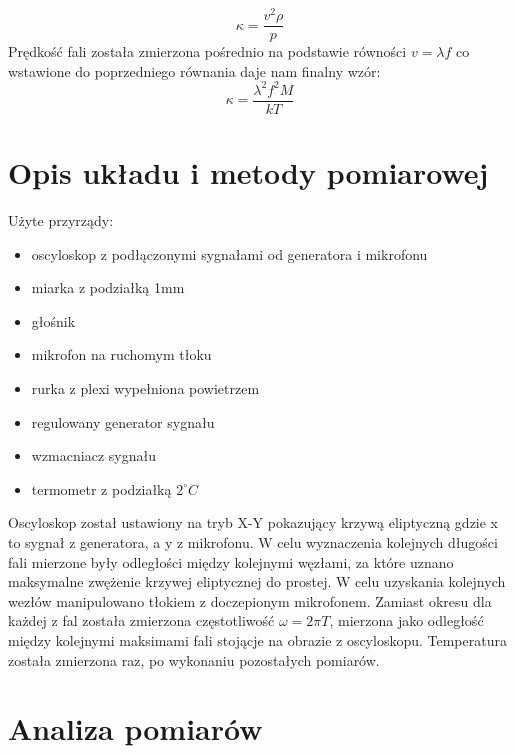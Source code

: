\documentclass[a4paper,10pt]{article}
\begin{document}
\begin{equation}
  \kappa = \frac{v^2 \rho}{p}
\end{equation}
Prędkość fali została zmierzona pośrednio na podstawie równości $v = \lambda f$ co wstawione do poprzedniego równania daje nam finalny wzór:
\begin{equation}
  \kappa = \frac{\lambda^2 f^2 M}{kT}
\end{equation}

\section{Opis układu i metody pomiarowej}
Użyte przyrządy:
\begin{itemize}
  \item oscyloskop z podłączonymi sygnałami od generatora i mikrofonu
  \item miarka z podziałką 1mm
  \item głośnik
  \item mikrofon na ruchomym tłoku
  \item rurka z plexi wypełniona powietrzem
  \item regulowany generator sygnału
	\item wzmacniacz sygnału
  \item termometr z podziałką $2^\circ C$
\end{itemize}
Oscyloskop został ustawiony na tryb X-Y pokazujący krzywą eliptyczną gdzie x to sygnał z generatora, a y z mikrofonu. W celu wyznaczenia kolejnych długości fali mierzone były odległości między kolejnymi węzłami, za które uznano maksymalne zwężenie krzywej eliptycznej do prostej. W celu uzyskania kolejnych  wezłów manipulowano tłokiem z doczepionym mikrofonem.
Zamiast okresu dla każdej z fal została zmierzona częstotliwość $\omega = 2 \pi T$, mierzona jako odległość między kolejnymi maksimami fali stojącje na
obrazie z oscyloskopu. Temperatura została zmierzona raz, po wykonaniu pozostałych pomiarów.

\section{Analiza pomiarów}
\end{document}
